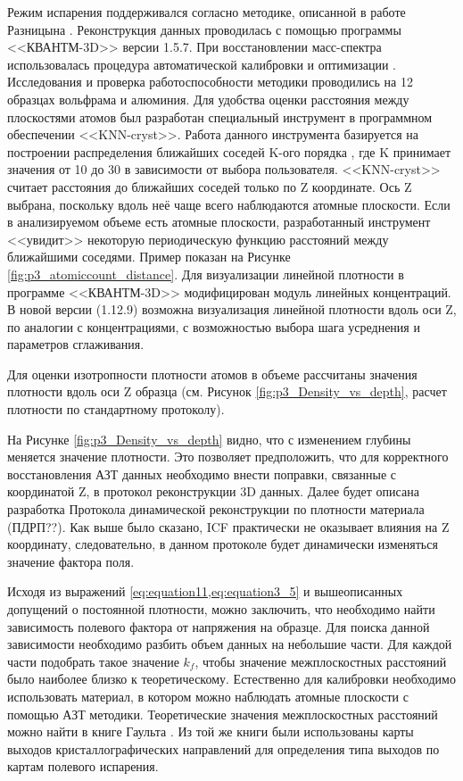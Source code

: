 Режим испарения поддерживался согласно методике, описанной в работе Разницына \cite{scbibOptParamsYAFI}. Реконструкция данных проводилась с помощью программы <<КВАНТМ-3D>> версии 1.5.7. При восстановлении масс-спектра использовалась процедура автоматической калибровки и оптимизации \cite{Shutov19}. Исследования и проверка работоспособности методики проводились на 12 образцах вольфрама и алюминия. Для удобства оценки расстояния между плоскостями атомов был разработан специальный инструмент в программном обеспечении <<KNN-cryst>>. Работа данного инструмента базируется на построении распределения ближайших соседей K-ого порядка \cite{GaultBOOK}, где K принимает значения от 10 до 30 в зависимости от выбора пользователя. <<KNN-cryst>> считает расстояния до ближайших соседей только по Z координате. Ось Z выбрана, поскольку вдоль неё чаще всего наблюдаются атомные плоскости. Если в анализируемом объеме есть атомные плоскости, разработанный инструмент <<увидит>> некоторую периодическую функцию расстояний между ближайшими соседями. Пример показан на Рисунке \cref{fig:p3_atomiccount_distance}. Для визуализации линейной плотности в программе <<КВАНТМ-3D>> модифицирован модуль линейных концентраций. В новой версии (1.12.9) возможна визуализация линейной плотности вдоль оси Z, по аналогии с концентрациями, с возможностью выбора шага усреднения и параметров сглаживания.

Для оценки изотропности плотности атомов в объеме рассчитаны значения плотности вдоль оси Z образца (см. Рисунок \cref{fig:p3_Density_vs_depth}, расчет плотности по стандартному протоколу). 

На Рисунке \cref{fig:p3_Density_vs_depth} видно, что с изменением глубины меняется значение плотности. Это позволяет предположить, что для корректного восстановления АЗТ данных необходимо внести поправки, связанные с координатой Z, в протокол реконструкции 3D данных. Далее будет описана разработка Протокола динамической реконструкции по плотности материала (ПДРП??). Как выше было сказано, ICF практически не оказывает влияния на Z координату, следовательно, в данном протоколе будет динамически изменяться значение фактора поля.

Исходя из выражений \cref{eq:equation11,eq:equation3_5} и вышеописанных допущений о постоянной плотности, можно заключить, что необходимо найти зависимость полевого фактора от напряжения на образце. Для поиска данной зависимости необходимо разбить объем данных на небольшие части. Для каждой части подобрать такое значение $k_f$, чтобы значение межплоскостных расстояний было наиболее близко к теоретическому. Естественно для калибровки необходимо использовать материал, в котором можно наблюдать атомные плоскости с помощью АЗТ методики. Теоретические значения межплоскостных расстояний можно найти в книге Гаульта \cite{GaultBOOK}. Из той же книги были использованы карты выходов кристаллографических направлений для определения типа выходов по картам полевого испарения.

